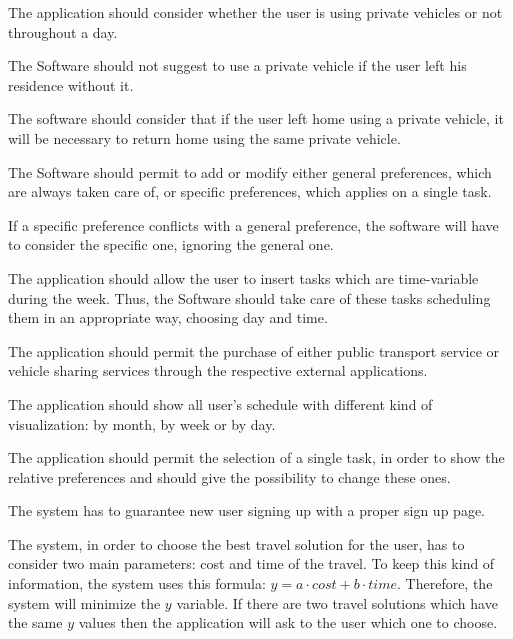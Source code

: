 \begin{requirementList}
    \item The application should consider whether the user is using private vehicles or not throughout a day.
    \begin{enumerate}[label={[}R 10.\arabic*{]}:]
    \item The Software should not suggest to use a private vehicle if the user left his residence without it.
   
    \item The software should consider that if the user left home using a private vehicle, it will be necessary to return home using the same private vehicle.
    \end{enumerate}
    
    \item The Software should permit to add or modify either general preferences, which are always taken care of, or specific preferences, which applies on a single task.
    \begin{enumerate}[label={[}R 11.\arabic*{]}:]
    \item If a specific preference conflicts with a general preference, the software will have to consider the specific one, ignoring the general one.
    \end{enumerate}
    
    \item The application should allow the user to insert tasks which are time-variable during the week. Thus, the Software should take care of these tasks scheduling them in an appropriate way, choosing day and time.
    
    \item The application should permit the purchase of either public transport service or vehicle sharing services through the respective external applications.
    
    \item The application should show all user's schedule with different kind of visualization: by month, by week or by day.
    
    \item The application should permit the selection of a single task, in order to show the relative preferences and should give the possibility to change these ones.
    
    \item The system has to guarantee new user signing up with a proper sign up page. 
    
    \item The system, in order to choose the best travel solution for the user, has to consider two main parameters: cost and time of the travel. To keep this kind of information, the system uses this formula: \( y = a \cdot cost + b \cdot time\). Therefore, the system will minimize the \(y\) variable. If there are two travel solutions which have the same \(y\) values then the application will ask to the user which one to choose.
    

\end{requirementList}
